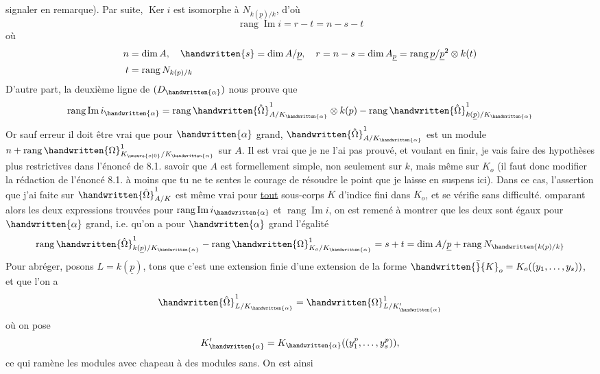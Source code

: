 signaler en remarque). Par suite, $\operatorname{Ker}i$ est isomorphe à $N_{k(\underline p)/k}$, d'où
\[
\operatorname{rang}\operatorname{Im}i=r-t=n-s-t
\]
où
\[
\begin{aligned}
n&=\dim A,\quad \handwritten{s}=\dim A/\underline p,\quad r=n-s=\dim A_{\underline p}=\operatorname{rang}\underline p/\underline p^{2}\otimes k(t)\\
t&=\operatorname{rang}N_{k(p)/k}
\end{aligned}
\]
D'autre part, la deuxième ligne de $(D_{\handwritten{\alpha}})$ nous prouve que
\[
\operatorname{rang}\operatorname{Im}i_{\handwritten{\alpha}}
=\operatorname{rang}\handwritten{\hat\Omega}^{1}_{A/K_{\handwritten{\alpha}}}\otimes k(p)
-\operatorname{rang}\handwritten{\hat\Omega}^{1}_{k(\underline p)/K_{\handwritten{\alpha}}}
\]
Or  sauf erreur il doit être vrai que pour $\handwritten{\alpha}$ grand, $\handwritten{\hat\Omega}^{1}_{A/K_{\handwritten{\alpha}}}$ est un module  $n+\operatorname{rang}\handwritten{\Omega}^{1}_{K_{\unsure{o|0}}/K_{\handwritten{\alpha}}}$ sur $A$. Il est vrai que je ne l'ai pas prouvé, et  voulant en finir, je vais faire des hypothèses plus restrictives dans l'énoncé de 8.1. savoir que $A$ est formellement simple, non seulement sur $k$, mais même sur $K_o$ (il faut donc modifier la rédaction de l'énoncé 8.1. à moins que tu ne te sentes le courage de résoudre le point que je laisse en suspens ici). Dans ce cas, l'assertion que j'ai faite sur $\handwritten{\hat\Omega}^{1}_{A/K}$ est même vrai pour \uline{tout} sous-corps $K$ d'indice fini dans $K_o$, et se vérifie sans difficulté. omparant alors les deux expressions trouvées pour $\operatorname{rang}\operatorname{Im}i_{\handwritten{\alpha}}$ et $\operatorname{rang}\operatorname{Im}i$, on est remené à montrer que les deux sont égaux pour $\handwritten{\alpha}$ grand, i.e. qu'on a pour $\handwritten{\alpha}$ grand l'égalité
\[
\operatorname{rang}\handwritten{\hat\Omega}^{1}_{k(\underline p)/K_{\handwritten{\alpha}}}
-\operatorname{rang}\handwritten{\Omega}^{1}_{K_o/K_{\handwritten{\alpha}}}
=s+t=\dim A/\underline p+\operatorname{rang}N_{\handwritten{k(p)/k}}
\]
Pour abréger, posons $L=k(\underline p)$, tons que c'est une extension finie d'une extension de la forme $\handwritten{\bar}{K}_o=K_o((y_1,\ldots,y_s))$, et que l'on a
\[
\handwritten{\hat\Omega}^{1}_{L/K_{\handwritten{\alpha}}}=\handwritten{\Omega}^{1}_{L/K'_{\handwritten{\alpha}}}
\]
où on pose
\[
K'_{\handwritten{\alpha}}=K_{\handwritten{\alpha}}((y_1^p,\ldots,y_s^p)),
\]
ce qui ramène les modules avec chapeau à des modules sans. On est ainsi
